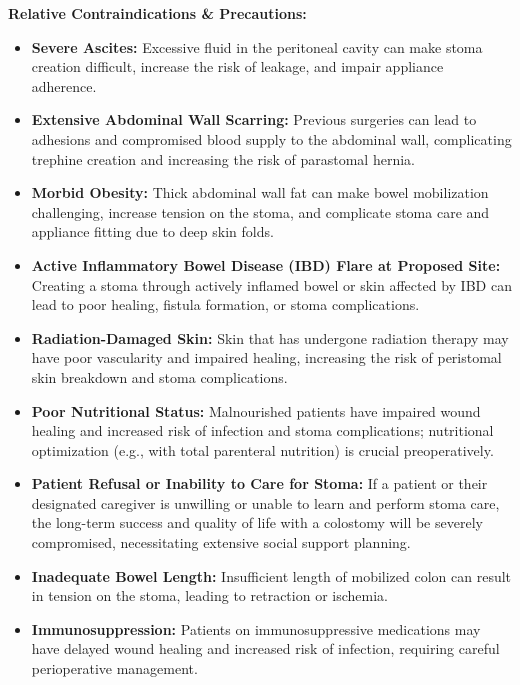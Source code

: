 \textbf{Relative Contraindications \& Precautions:}
\begin{itemize}
  \item \textbf{Severe Ascites:} Excessive fluid in the peritoneal cavity can make stoma creation difficult, increase the risk of leakage, and impair appliance adherence.
  
  \item \textbf{Extensive Abdominal Wall Scarring:} Previous surgeries can lead to adhesions and compromised blood supply to the abdominal wall, complicating trephine creation and increasing the risk of parastomal hernia.
  
  \item \textbf{Morbid Obesity:} Thick abdominal wall fat can make bowel mobilization challenging, increase tension on the stoma, and complicate stoma care and appliance fitting due to deep skin folds.
  
  \item \textbf{Active Inflammatory Bowel Disease (IBD) Flare at Proposed Site:} Creating a stoma through actively inflamed bowel or skin affected by IBD can lead to poor healing, fistula formation, or stoma complications.
  
  \item \textbf{Radiation-Damaged Skin:} Skin that has undergone radiation therapy may have poor vascularity and impaired healing, increasing the risk of peristomal skin breakdown and stoma complications.
  
  \item \textbf{Poor Nutritional Status:} Malnourished patients have impaired wound healing and increased risk of infection and stoma complications; nutritional optimization (e.g., with total parenteral nutrition) is crucial preoperatively.
  
  \item \textbf{Patient Refusal or Inability to Care for Stoma:} If a patient or their designated caregiver is unwilling or unable to learn and perform stoma care, the long-term success and quality of life with a colostomy will be severely compromised, necessitating extensive social support planning.
  
  \item \textbf{Inadequate Bowel Length:} Insufficient length of mobilized colon can result in tension on the stoma, leading to retraction or ischemia.
  
  \item \textbf{Immunosuppression:} Patients on immunosuppressive medications may have delayed wound healing and increased risk of infection, requiring careful perioperative management.
\end{itemize}

